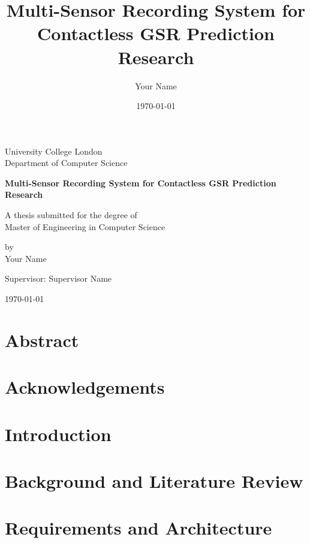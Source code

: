 \documentclass[12pt,a4paper,oneside]{report}
\title{Multi-Sensor Recording System for Contactless GSR Prediction Research}
\author{Your Name}
\date{\today}
\begin{document}
\begin{titlepage}
    \centering
    \vspace*{2cm}

    {\LARGE University College London\\[0.5cm]}
    {\large Department of Computer Science\\[2cm]}

    {\Huge\bfseries Multi-Sensor Recording System for Contactless GSR Prediction Research\\[2cm]}

    {\Large A thesis submitted for the degree of\\
    Master of Engineering in Computer Science\\[2cm]}

    {\large by\\[0.5cm]}
    {\Large Your Name\\[2cm]}

    {\large Supervisor: Supervisor Name\\[1cm]}

    {\large \today}

    \vfill
\end{titlepage}

\chapter*{Abstract}


\chapter*{Acknowledgements}


\tableofcontents
\listoffigures
\listoftables

\chapter{Introduction}


\chapter{Background and Literature Review}


\chapter{Requirements and Architecture}

\end{document}
